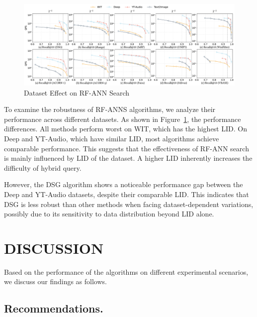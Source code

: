 \documentclass[sigconf, nonacm]{acmart}
\begin{document}
	\begin{figure}[htbp]
		\centering
		\includegraphics[width=\textwidth]{figures/exp/exp_8_3.pdf}
		\caption{Dataset Effect on RF-ANN Search}
		\label{fig:exp_8_3}
	\end{figure}
	
	
	To examine the robustness of RF-ANNS algorithms, we analyze their performance across different datasets. As shown in Figure~\ref{fig:exp_8_3}, the performance differences. All methods perform worst on WIT, which has the highest LID. On Deep and YT-Audio, which have similar LID, most algorithms achieve comparable performance. 
	This suggests that the effectiveness of RF-ANN search is mainly influenced by LID of the dataset. A higher LID inherently increases the difficulty of hybrid query.
	
	However, the DSG algorithm shows a noticeable performance gap between the Deep and YT-Audio datasets, despite their comparable LID. This indicates that DSG is less robust than other methods when facing dataset-dependent variations, possibly due to its sensitivity to data distribution beyond LID alone.
	
	\section{DISCUSSION}
	Based on the performance of the algorithms on different experimental scenarios, we discuss our findings as follows.
	
	
	\subsection{Recommendations.}
\end{document}
